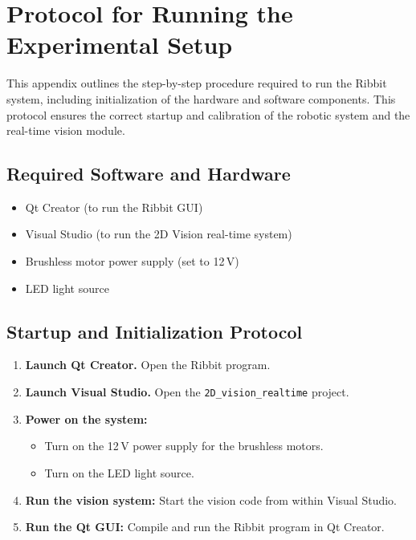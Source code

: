 


\appendix
{} %
\section{Protocol for Running the Experimental Setup}
\label{app:protocol}

This appendix outlines the step-by-step procedure required to run the Ribbit system, including initialization of the hardware and software components. This protocol ensures the correct startup and calibration of the robotic system and the real-time vision module.

\subsection*{Required Software and Hardware}
\begin{itemize}
    \item Qt Creator (to run the Ribbit GUI)
    \item Visual Studio (to run the 2D Vision real-time system)
    \item Brushless motor power supply (set to 12\,V)
    \item LED light source
\end{itemize}

\subsection*{Startup and Initialization Protocol}

\begin{enumerate}
    \item \textbf{Launch Qt Creator.} Open the Ribbit program.
    \item \textbf{Launch Visual Studio.} Open the \texttt{2D\_vision\_realtime} project.
    \item \textbf{Power on the system:}
    \begin{itemize}
        \item Turn on the 12\,V power supply for the brushless motors.
        \item Turn on the LED light source.
    \end{itemize}
    \item \textbf{Run the vision system:} Start the vision code from within Visual Studio.
    \item \textbf{Run the Qt GUI:} Compile and run the Ribbit program in Qt Creator.
\end{enumerate}

